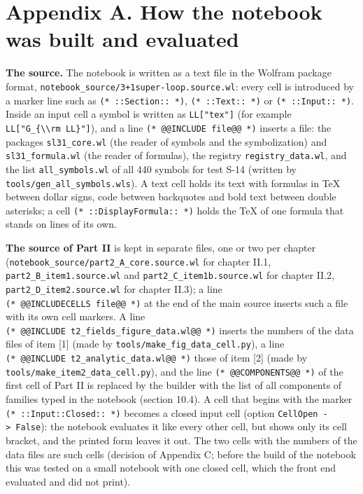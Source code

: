 \documentclass[
  10pt,
]{article}
\begin{document}
\hypertarget{appendix-a.-how-the-notebook-was-built-and-evaluated}{%
\section{Appendix A. How the notebook was built and
evaluated}\label{appendix-a.-how-the-notebook-was-built-and-evaluated}}

\textbf{The source.} The notebook is written as a text file in the
Wolfram package format,
\texttt{notebook\_source/3+1super-loop.source.wl}: every cell is
introduced by a marker line such as \texttt{(*\ ::Section::\ *)},
\texttt{(*\ ::Text::\ *)} or \texttt{(*\ ::Input::\ *)}. Inside an input
cell a symbol is written as \texttt{LL{[}"tex"{]}} (for example
\texttt{LL{[}"G\_\{\textbackslash{}\textbackslash{}rm\ LL\}"{]}}), and a
line \texttt{(*\ @@INCLUDE\ file@@\ *)} inserts a file: the packages
\texttt{sl31\_core.wl} (the reader of symbols and the symbolization) and
\texttt{sl31\_formula.wl} (the reader of formulas), the registry
\texttt{registry\_data.wl}, and the list \texttt{all\_symbols.wl} of all
440 symbols for test S-14 (written by
\texttt{tools/gen\_all\_symbols.wls}). A text cell holds its text with
formulas in TeX between dollar signs, code between backquotes and bold
text between double asterisks; a cell
\texttt{(*\ ::DisplayFormula::\ *)} holds the TeX of one formula that
stands on lines of its own.

\textbf{The source of Part II} is kept in separate files, one or two per
chapter (\texttt{notebook\_source/part2\_A\_core.source.wl} for chapter
II.1, \texttt{part2\_B\_item1.source.wl} and
\texttt{part2\_C\_item1b.source.wl} for chapter II.2,
\texttt{part2\_D\_item2.source.wl} for chapter II.3); a line
\texttt{(*\ @@INCLUDECELLS\ file@@\ *)} at the end of the main source
inserts such a file with its own cell markers. A line
\texttt{(*\ @@INCLUDE\ t2\_fields\_figure\_data.wl@@\ *)} inserts the
numbers of the data files of item {[}1{]} (made by
\texttt{tools/make\_fig\_data\_cell.py}), a line
\texttt{(*\ @@INCLUDE\ t2\_analytic\_data.wl@@\ *)} those of item
{[}2{]} (made by \texttt{tools/make\_item2\_data\_cell.py}), and the
line \texttt{(*\ @@COMPONENTS@@\ *)} of the first cell of Part II is
replaced by the builder with the list of all components of families
typed in the notebook (section 10.4). A cell that begins with the marker
\texttt{(*\ ::Input::Closed::\ *)} becomes a closed input cell (option
\texttt{CellOpen\ -\textgreater{}\ False}): the notebook evaluates it
like every other cell, but shows only its cell bracket, and the printed
form leaves it out. The two cells with the numbers of the data files are
such cells (decision of Appendix C; before the build of the notebook
this was tested on a small notebook with one closed cell, which the
front end evaluated and did not print).
\end{document}
